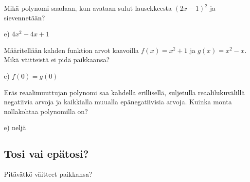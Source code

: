 \begin{multicols}{2}
\begin{tehtava}
Mikä polynomi saadaan, kun avataan sulut lausekkeesta $(2x-1)^2$ ja sievennetään?
		\begin{vastaus}
e) $4x^2-4x+1$
	\end{vastaus}
\end{tehtava}

\begin{tehtava}
Määritellään kahden funktion arvot kaavoilla $f(x) = x^2 + 1$ ja $g(x) = x^2 - x$. Mikä väitteistä ei pidä paikkaansa?
	\begin{vastaus}
	c) $f(0) = g(0)$
	\end{vastaus}
\end{tehtava}
\begin{tehtava}
Eräs reaalimuuttujan polynomi saa kahdella erillisellä, suljetulla reaalilukuvälillä negatiivia arvoja ja kaikkialla muualla epänegatiivisia arvoja. Kuinka monta nollakohtaa polynomilla on?
	\begin{vastaus}
	e) neljä
	\end{vastaus}
\end{tehtava}


\end{multicols}

\newpage %
\subsection*{Tosi vai epätosi?}

Pitävätkö väitteet paikkansa?

